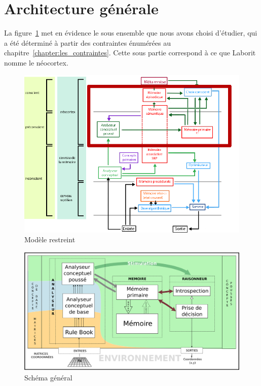 \section{Architecture générale}

La figure~\ref{modele_restreint} met en évidence le sous ensemble que nous avons choisi d'étudier, qui a été déterminé à partir des contraintes énumérées au chapitre~\ref{chapter:les_contraintes}. Cette sous partie correspond à ce que Laborit nomme le néocortex.

\begin{figure}[H] 
\includegraphics[width=\textwidth]{files/modele_restreint} 
\caption{Modèle restreint} 
\label{modele_restreint}
\end{figure}

\begin{figure}[H] 
\includegraphics[width=\textwidth]{files/simplified_general_diagram} 
\caption{Schéma général} 
\label{schema_general}
\end{figure}

